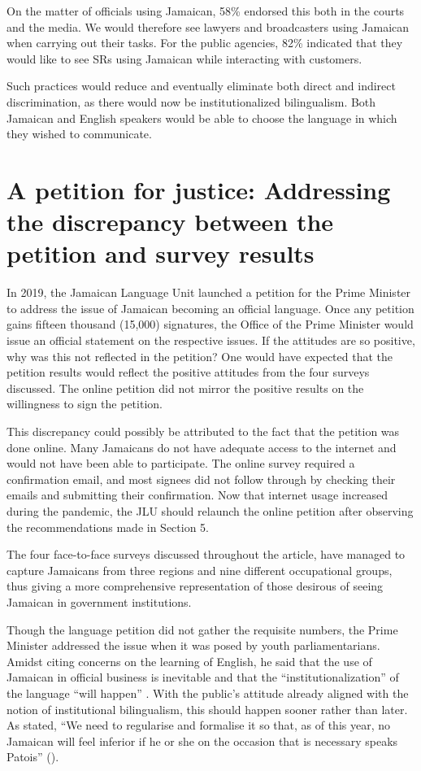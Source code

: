 \documentclass[output=paper,colorlinks,citecolor=brown]{langscibook}
\begin{document}
\newpage
On the matter of officials using Jamaican, 58\% endorsed this both in the courts and the media. We would therefore see lawyers and broadcasters using Jamaican when carrying out their tasks. For the public agencies, 82\% indicated that they would like to see SRs using Jamaican while interacting with customers. 

Such practices would reduce and eventually eliminate both direct and indirect discrimination, as there would now be institutionalized bilingualism. Both Jamaican and English speakers would be able to choose the language in which they wished to communicate. 


\section{A petition for justice: Addressing the discrepancy between the petition and survey results}

In 2019, the Jamaican Language Unit launched a petition for the Prime Minister to address the issue of Jamaican becoming an official language. Once any petition gains fifteen thousand (15,000) signatures, the Office of the Prime Minister would issue an official statement on the respective issues.  If the attitudes are so positive, why was this not reflected in the petition? One would have expected that the petition results would reflect the positive attitudes from the four surveys discussed. The online petition did not mirror the positive results on the willingness to sign the petition. 

This discrepancy could possibly be attributed to the fact that the petition was done online. Many Jamaicans do not have adequate access to the internet and would not have been able to participate. The online survey required a confirmation email, and most signees did not follow through by checking their emails and submitting their confirmation. Now that internet usage increased during the pandemic, the JLU should relaunch the online petition after observing the recommendations made in Section 5. 

The four face-to-face surveys discussed throughout the article, have managed to capture Jamaicans from three regions and nine different occupational groups, thus giving a more comprehensive representation of those desirous of seeing Jamaican in government institutions.  

\begin{sloppypar}
Though the language petition did not gather the requisite numbers, the Prime Minister addressed the issue when it was posed by youth parliamentarians. Amidst citing concerns on the learning of English, he said that the use of Jamaican in official business is inevitable and that the “institutionalization” of the language “will happen” \citep{NationwideNews2019}. With the public’s attitude already aligned with the notion of institutional bilingualism, this should happen sooner rather than later. As \citeauthor{Smith2012} stated, “We need to regularise and formalise it so that, as of this year, no Jamaican will feel inferior if he or she on the occasion that is necessary speaks Patois” (\citeyear{Smith2012}).
\end{sloppypar}
\end{document}
